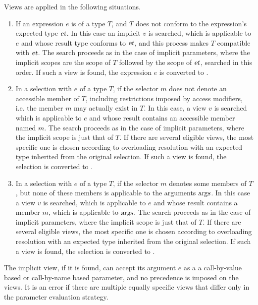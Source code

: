 Views are applied in the following situations.
\begin{enumerate}
\item If an expression $e$ is of a type $T$, and $T$ does not conform to the expression's expected type $\mbox{\sl et}$. In this case an implicit $v$ is searched, which is applicable to $e$ and whose result type conforms to $\mbox{\sl et}$, and this process makes $T$ compatible with $\mbox{\sl et}$. The search proceeds as in the case of implicit parameters, where the implicit scopes are the scope of $T$ followed by the scope of $\mbox{\sl et}$, searched in this order. If such a view is found, the expression $e$ is converted to . 

\item In a selection  with $e$ of a type $T$, if the selector $m$ does not denote an accessible member of $T$, including restrictions imposed by access modifiers, i.e. the member $m$ may actually exist in $T$. In this case, a view $v$ is searched which is applicable to $e$ and whose result contains an accessible member named $m$. The search proceeds as in the case of implicit parameters, where the implicit scope is just that of $T$. If there are several eligible views, the most specific one is chosen according to overloading resolution with an expected type inherited from the original selection. If such a view is found, the selection  is converted to . 

\item In a selection  with $e$ of a type $T$, if the selector $m$ denotes some members of $T$, but none of these members is applicable to the arguments $\mbox{\sl args}$. In this case a view $v$ is searched, which is applicable to $e$ and whose result contains a member $m$, which is applicable to $\mbox{\sl args}$. The search proceeds as in the case of implicit parameters, where the implicit scope is just that of $T$. If there are several eligible views, the most specific one is chosen according to overloading resolution with an expected type inherited from the original selection. If such a view is found, the selection  is converted to . 
\end{enumerate}

The implicit view, if it is found, can accept its argument $e$ as a a call-by-value based or call-by-name based parameter, and no precedence is imposed on the views. It is an error if there are multiple equally specific views that differ only in the parameter evaluation strategy. 

